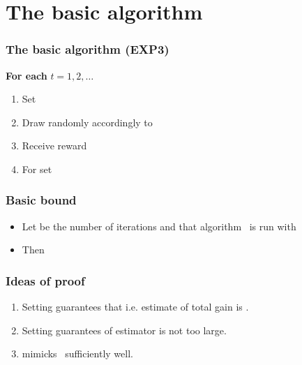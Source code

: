 \documentclass[handout]{beamer}
\begin{document}
\section{The basic algorithm}

\begin{frame}
\frametitle{The basic algorithm (EXP3)}
{\bf For each} $t=1,2,\ldots$
\begin{enumerate}
\item
Set
\R{\[
        \p{i}{t} = (1-\gamma)\frac{\wt{t}{i}}{\sum_{j=1}^K \wt{t}{j}} + \frac{\gamma}{K}
        \qquad i=1,\ldots,K.
\]}
\item      
Draw  randomly accordingly to 
\item
Receive reward \R{$\xit \in [0,1]$}
\item 
For  set 
\end{enumerate}
\end{frame}


\begin{frame}
\frametitle{Basic bound}
\begin{itemize}
\item
Let  be the number of iterations and that algorithm~\B{$\Aest$}
is run with 
\item
Then
\end{itemize}

\end{frame}

\begin{frame}
\frametitle{Ideas of proof}
\begin{enumerate}
\item Setting
\R{\[
        \hx{j}{t} = \left\{ \begin{array}{cl}
                \x{j}{t}/\p{j}{t} & \mbox{\rm if $j=\i{t}$}
        \\
                0 & \mbox{\rm otherwise,}
        \end{array} \right.
\]}
guarantees that
i.e. estimate of total gain is .
\item
Setting  guarantees  of estimator is not too large.
\item
\B{$\Aest$} mimicks \B{\hedge}\ sufficiently well.
\end{enumerate}
\end{frame}
\end{document}
